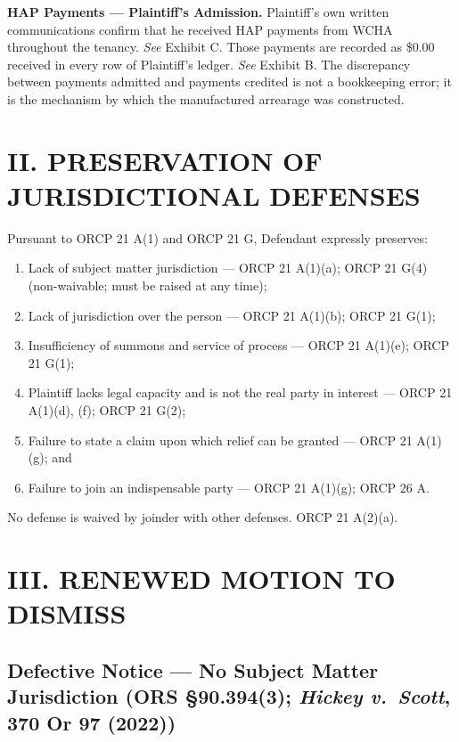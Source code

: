 \documentclass[12pt,letterpaper]{article}
\begin{document}
\textbf{HAP Payments --- Plaintiff's Admission.} Plaintiff's own written communications confirm that he received HAP payments from WCHA throughout the tenancy. \textit{See} Exhibit C. Those payments are recorded as \$0.00 received in every row of Plaintiff's ledger. \textit{See} Exhibit B. The discrepancy between payments admitted and payments credited is not a bookkeeping error; it is the mechanism by which the manufactured arrearage was constructed.

\section*{II. PRESERVATION OF JURISDICTIONAL DEFENSES}

Pursuant to ORCP 21 A(1) and ORCP 21 G, Defendant expressly preserves:

\begin{enumerate}[label=(\alph*)]
  \item Lack of subject matter jurisdiction --- ORCP 21 A(1)(a); ORCP 21 G(4) (non-waivable; must be raised at any time);
  \item Lack of jurisdiction over the person --- ORCP 21 A(1)(b); ORCP 21 G(1);
  \item Insufficiency of summons and service of process --- ORCP 21 A(1)(e); ORCP 21 G(1);
  \item Plaintiff lacks legal capacity and is not the real party in interest --- ORCP 21 A(1)(d), (f); ORCP 21 G(2);
  \item Failure to state a claim upon which relief can be granted --- ORCP 21 A(1)(g); and
  \item Failure to join an indispensable party --- ORCP 21 A(1)(g); ORCP 26 A.
\end{enumerate}

No defense is waived by joinder with other defenses. ORCP 21 A(2)(a).

\section*{III. RENEWED MOTION TO DISMISS}

\subsection{Defective Notice --- No Subject Matter Jurisdiction (ORS \S90.394(3); \textit{Hickey v.\ Scott}, 370 Or 97 (2022))}
\end{document}
